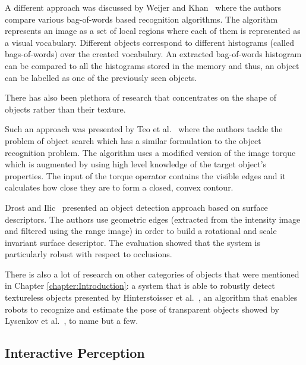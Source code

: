 A different approach was discussed by Weijer and Khan~\cite{van2013fusing} where the authors compare various bag-of-words based recognition algorithms. The algorithm represents an image as a set of local regions where each of them is represented as a visual vocabulary. Different objects correspond to different histograms (called bags-of-words) over the created vocabulary. An extracted bag-of-words histogram can be compared to all the histograms stored in the memory and thus, an object can be labelled as one of the previously seen objects. 

There has also been plethora of research that concentrates on the shape of objects rather than their texture. 

Such an approach was presented by Teo et al.~\cite{teoembedding} where the authors tackle the problem of object search which has a similar formulation to the object recognition problem. The algorithm uses a modified version of the image torque~\cite{nishigaki2012image} which is augmented by using high level knowledge of the target object's properties. The input of the torque operator contains the visible edges and it calculates how close they are to form a closed, convex contour.

Drost and Ilic~\cite{drost20123d} presented an object detection approach based on surface descriptors. The authors use geometric edges (extracted from the intensity image and filtered using the range image) in order to build a rotational and scale invariant surface descriptor. The evaluation showed that the system is particularly robust with respect to occlusions.  

There is also a lot of research on other categories of objects that were mentioned in Chapter \ref{chapter:Introduction}: a system that is able to robustly detect textureless objects presented by Hinterstoisser et al.~\cite{hinterstoisser2011multimodal}, an algorithm that enables robots to recognize and estimate the pose of transparent objects showed by Lysenkov et al.~\cite{lysenkov2012recognition}, to name but a few. 

\newpage

\subsection{Interactive Perception}



